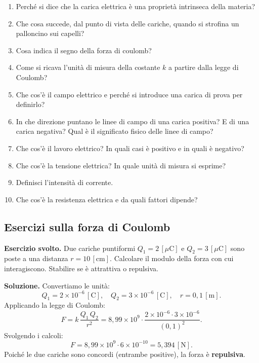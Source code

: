 \begin{enumerate}[leftmargin=1cm]
  \item Perché si dice che la carica elettrica è una proprietà intrinseca della materia?
  \item Che cosa succede, dal punto di vista delle cariche, quando si strofina un palloncino sui capelli?
  \item Cosa indica il segno della forza di coulomb?
  \item Come si ricava l'unità di misura della costante \(k\) a partire dalla legge di Coulomb?
  \item Che cos'è il campo elettrico e perché si introduce una carica di prova per definirlo?
  \item In che direzione puntano le linee di campo di una carica positiva? E di una carica negativa? Qual è il significato fisico delle linee di campo?
  \item Che cos'è il lavoro elettrico? In quali casi è positivo e in quali è negativo?
  \item Che cos'è la tensione elettrica? In quale unità di misura si esprime?
  \item Definisci l'intensità di corrente.
  \item Che cos'è la resistenza elettrica e da quali fattori dipende?
\end{enumerate}

\subsection{Esercizi sulla forza di Coulomb}

\begin{esercizio}
\textbf{Esercizio svolto.} Due cariche puntiformi \(Q_1 = 2\,[\mu\text{C}]\) e \(Q_2 = 3\,[\mu\text{C}]\) sono poste a una distanza \(r = 10\,[\text{cm}]\). Calcolare il modulo della forza con cui interagiscono. Stabilire se è attrattiva o repulsiva.

\smallskip
\textbf{Soluzione.} Convertiamo le unità:
\[
Q_1 = 2 \times 10^{-6}\,[\text{C}], \quad Q_2 = 3 \times 10^{-6}\,[\text{C}], \quad r = 0{,}1\,[\text{m}].
\]
Applicando la legge di Coulomb:
\[
F = k\,\frac{Q_1\,Q_2}{r^2} = 8{,}99 \times 10^9 \cdot \frac{2\times 10^{-6} \cdot 3\times 10^{-6}}{(0{,}1)^2}.
\]
Svolgendo i calcoli:
\[
F = 8{,}99 \times 10^9 \cdot 6 \times 10^{-10} = 5{,}394\,[\text{N}].
\]
Poiché le due cariche sono concordi (entrambe positive), la forza è \textbf{repulsiva}.
\end{esercizio}

